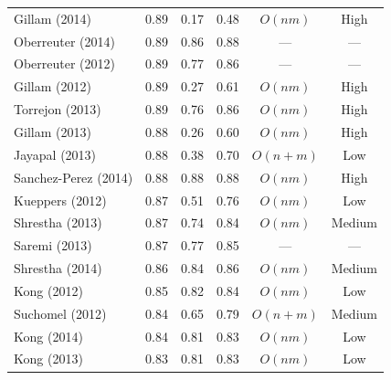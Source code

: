 \documentclass[fleqn,10pt]{wlscirep}
\begin{document}
\begin{table}[ht]
\begin{tabular}{@{}l*{3}{c}cc@{}}
        Gillam (2014)   &       0.89            &    0.17       &  0.48             & $O(nm)$       & High              \\ %
    Oberreuter (2014)   &       0.89            &    0.86       &  0.88             & ---           & ---               \\
    Oberreuter (2012)   &       0.89            &    0.77       &  0.86             & ---           & ---               \\ %
        Gillam (2012)   &       0.89            &    0.27       &  0.61             & $O(nm)$       & High              \\ %
      Torrejon (2013)   &       0.89            &    0.76       &  0.86             & $O(nm)$       & High              \\ %
        Gillam (2013)   &       0.88            &    0.26       &  0.60             & $O(nm)$       & High              \\ %
       Jayapal (2013)   &       0.88            &    0.38       &  0.70             & $O(n+m)$      & Low               \\
 Sanchez-Perez (2014)   &       0.88            &    0.88       &  0.88             & $O(nm)$       & High              \\
      Kueppers (2012)   &       0.87            &    0.51       &  0.76             & $O(nm)$       & Low               \\
      Shrestha (2013)   &       0.87            &    0.74       &  0.84             & $O(nm)$       & Medium            \\
        Saremi (2013)   &       0.87            &    0.77       &  0.85             & ---           & ---               \\
      Shrestha (2014)   &       0.86            &    0.84       &  0.86             & $O(nm)$       & Medium            \\
          Kong (2012)   &       0.85            &    0.82       &  0.84             & $O(nm)$       & Low               \\
      Suchomel (2012)   &       0.84            &    0.65       &  0.79             & $O(n+m)$      & Medium            \\
          Kong (2014)   &       0.84            &    0.81       &  0.83             & $O(nm)$       & Low               \\
          Kong (2013)   &       0.83            &    0.81       &  0.83             & $O(nm)$       & Low               \\

\end{tabular}
\end{table}
\end{document}
